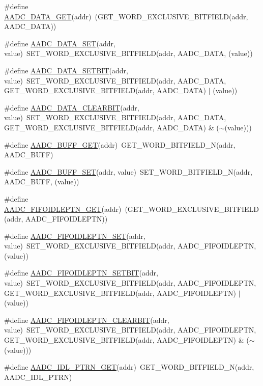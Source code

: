 \begin{DoxyCompactItemize}
\item 
\#define \hyperlink{a00542_ac44eb7e53fadf6e292fd6515832f6a69}{AADC\_\-DATA\_\-GET}(addr)~(GET\_\-WORD\_\-EXCLUSIVE\_\-BITFIELD(addr, AADC\_\-DATA))
\item 
\#define \hyperlink{a00542_a807bb6247f2c4309564dc37547ba3ce0}{AADC\_\-DATA\_\-SET}(addr, value)~SET\_\-WORD\_\-EXCLUSIVE\_\-BITFIELD(addr, AADC\_\-DATA, (value))
\item 
\#define \hyperlink{a00542_a43308040724c86e62cf8d7196fef7666}{AADC\_\-DATA\_\-SETBIT}(addr, value)~SET\_\-WORD\_\-EXCLUSIVE\_\-BITFIELD(addr, AADC\_\-DATA, GET\_\-WORD\_\-EXCLUSIVE\_\-BITFIELD(addr, AADC\_\-DATA) $|$ (value))
\item 
\#define \hyperlink{a00542_a595e26e0fdc65c0bf2d912584bfd564e}{AADC\_\-DATA\_\-CLEARBIT}(addr, value)~SET\_\-WORD\_\-EXCLUSIVE\_\-BITFIELD(addr, AADC\_\-DATA, GET\_\-WORD\_\-EXCLUSIVE\_\-BITFIELD(addr, AADC\_\-DATA) \& ($\sim$(value)))
\item 
\#define \hyperlink{a00542_a3a9d1312d7de51955e39036fc501501e}{AADC\_\-BUFF\_\-GET}(addr)~GET\_\-WORD\_\-BITFIELD\_\-N(addr, AADC\_\-BUFF)
\item 
\#define \hyperlink{a00542_aba65185fc9a2ae1e28eeb3b85652403a}{AADC\_\-BUFF\_\-SET}(addr, value)~SET\_\-WORD\_\-BITFIELD\_\-N(addr, AADC\_\-BUFF, (value))
\item 
\#define \hyperlink{a00542_abf64ccb3e4a0a440733c84965743ebbb}{AADC\_\-FIFOIDLEPTN\_\-GET}(addr)~(GET\_\-WORD\_\-EXCLUSIVE\_\-BITFIELD(addr, AADC\_\-FIFOIDLEPTN))
\item 
\#define \hyperlink{a00542_afb6785009ec0cf23ff3415189b7c1807}{AADC\_\-FIFOIDLEPTN\_\-SET}(addr, value)~SET\_\-WORD\_\-EXCLUSIVE\_\-BITFIELD(addr, AADC\_\-FIFOIDLEPTN, (value))
\item 
\#define \hyperlink{a00542_a68c58c252d051e5acd2b5e41000f70d4}{AADC\_\-FIFOIDLEPTN\_\-SETBIT}(addr, value)~SET\_\-WORD\_\-EXCLUSIVE\_\-BITFIELD(addr, AADC\_\-FIFOIDLEPTN, GET\_\-WORD\_\-EXCLUSIVE\_\-BITFIELD(addr, AADC\_\-FIFOIDLEPTN) $|$ (value))
\item 
\#define \hyperlink{a00542_a4699faa5976bab4e3c51c14a4e5dffcd}{AADC\_\-FIFOIDLEPTN\_\-CLEARBIT}(addr, value)~SET\_\-WORD\_\-EXCLUSIVE\_\-BITFIELD(addr, AADC\_\-FIFOIDLEPTN, GET\_\-WORD\_\-EXCLUSIVE\_\-BITFIELD(addr, AADC\_\-FIFOIDLEPTN) \& ($\sim$(value)))
\item 
\#define \hyperlink{a00542_af1eddc70b0231201db1d3bc575947f0c}{AADC\_\-IDL\_\-PTRN\_\-GET}(addr)~GET\_\-WORD\_\-BITFIELD\_\-N(addr, AADC\_\-IDL\_\-PTRN)
\item 

\end{DoxyCompactItemize}
